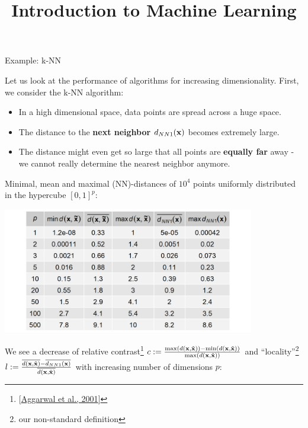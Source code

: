 



\newcommand{\titlefigure}{figure/knn_density_plot.png}
\newcommand{\learninggoals}{
  \item See how the performance of k-NN and the linear model deteriorates in high-dimensional spaces 
}

\title{Introduction to Machine Learning}
\date{}





\begin{vbframe}{Example: k-NN}

Let us look at the performance of algorithms for increasing dimensionality. First, we consider the k-NN algorithm:

\begin{itemize}
\item In a high dimensional space, data points are spread across a huge space.
\item The distance to the \textbf{next neighbor} $d_{NN1}(\mathbf{x})$ becomes extremely large.
\item The distance might even get so large that all points are \textbf{equally far} away - we cannot really determine the nearest neighbor anymore.
\end{itemize}

\framebreak 

Minimal, mean and maximal (NN)-distances of $10^{4}$ points uniformly distributed in the hypercube $[0,1]^p$:

\begin{center}
\includegraphics[width = 11cm ]{figure/knn_table.png}
\end{center}

\framebreak

We see a decrease of relative contrast\footnote{[\href{https://bib.dbvis.de/uploadedFiles/155.pdf}{Aggarwal et al., 2001}]} $c := \frac{\max(d(\mathbf{x},\tilde{\mathbf{x}})) - \min(d(\mathbf{x},\tilde{\mathbf{x}}))}{\max(d(\mathbf{x},\tilde{\mathbf{x}}))}$ and \enquote{locality}\footnote{our non-standard definition} $l := \frac{\overline{d(\mathbf{x},\tilde{\mathbf{x}})} -  \overline{d_{NN1}(\mathbf{x})}}{\overline{d(\mathbf{x},\tilde{\mathbf{x}})}}$ with increasing number of dimensions $p$:



\end{vbframe}
